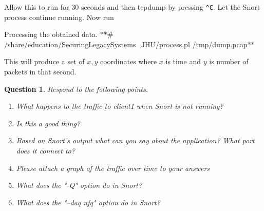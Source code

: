 \documentclass[a4paper,11pt,hidelinks]{article}
\newtheorem{theorem}{Question}[subsection]
\begin{document}
Allow this to run for 30 seconds and then tcpdump by pressing \verb=^C=. Let the Snort process continue running. Now run

\begin{code}{Processing the obtained data.}
**# /share/education/SecuringLegacySystems_JHU/process.pl /tmp/dump.pcap**
\end{code}

This will produce a set of $x,y$ coordinates where $x$ is time and $y$ is number of packets in that second.

\begin{theorem}
    Respond to the following points. 
    \begin{enumerate}
        \item What happens to the traffic to client1 when Snort is not running?
        \item Is this a good thing?
        \item Based on Snort's output what can you say about the application? What port does it connect to?
        \item Please attach a graph of the traffic over time to your answers
        \item What does the "-Q" option do in Snort?
        \item What does the "--daq nfq" option do in Snort?    
    \end{enumerate}
\end{theorem}
\end{document}
